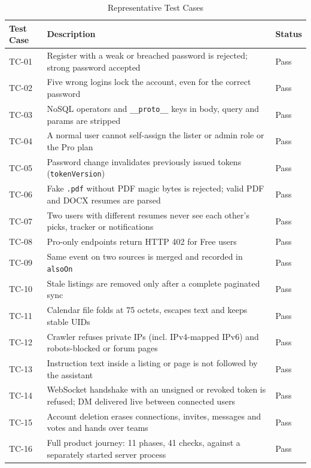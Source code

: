 \documentclass[12pt,a4paper]{report}
\begin{document}
\begin{table}[H]
\centering
\caption{Representative Test Cases}
\label{tab:tests}
\begin{tabularx}{\textwidth}{|l|X|l|}
\hline
\textbf{Test Case} & \textbf{Description} & \textbf{Status} \\
\hline
TC-01 & Register with a weak or breached password is rejected; strong password accepted & Pass \\
\hline
TC-02 & Five wrong logins lock the account, even for the correct password & Pass \\
\hline
TC-03 & NoSQL operators and \texttt{\_\_proto\_\_} keys in body, query and params are stripped & Pass \\
\hline
TC-04 & A normal user cannot self-assign the lister or admin role or the Pro plan & Pass \\
\hline
TC-05 & Password change invalidates previously issued tokens (\texttt{tokenVersion}) & Pass \\
\hline
TC-06 & Fake \texttt{.pdf} without PDF magic bytes is rejected; valid PDF and DOCX resumes are parsed & Pass \\
\hline
TC-07 & Two users with different resumes never see each other's picks, tracker or notifications & Pass \\
\hline
TC-08 & Pro-only endpoints return HTTP 402 for Free users & Pass \\
\hline
TC-09 & Same event on two sources is merged and recorded in \texttt{alsoOn} & Pass \\
\hline
TC-10 & Stale listings are removed only after a complete paginated sync & Pass \\
\hline
TC-11 & Calendar file folds at 75 octets, escapes text and keeps stable UIDs & Pass \\
\hline
TC-12 & Crawler refuses private IPs (incl. IPv4-mapped IPv6) and robots-blocked or forum pages & Pass \\
\hline
TC-13 & Instruction text inside a listing or page is not followed by the assistant & Pass \\
\hline
TC-14 & WebSocket handshake with an unsigned or revoked token is refused; DM delivered live between connected users & Pass \\
\hline
TC-15 & Account deletion erases connections, invites, messages and votes and hands over teams & Pass \\
\hline
TC-16 & Full product journey: 11 phases, 41 checks, against a separately started server process & Pass \\
\hline
\end{tabularx}
\end{table}
\end{document}
